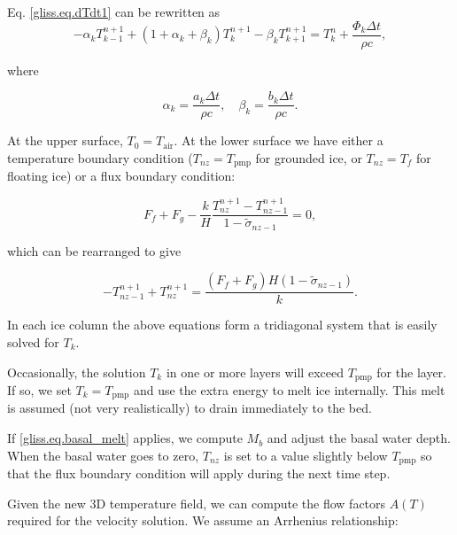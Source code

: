 Eq. \eqref{gliss.eq.dTdt1} can be rewritten as
\begin{equation}
  \label{gliss.eq.dTdt2}
  -{{\alpha }_{k}}T_{k-1}^{n+1} + (1+{{\alpha }_{k}}+{{\beta }_{k}})T_{k}^{n+1} - {{\beta }_{k}}T_{k+1}^{n+1} =
  T_{k}^{n} + \frac{{{\Phi }_{k}}\Delta t}{\rho c},
\end{equation}

\noindent
where

\begin{equation}
   {{\alpha }_{k}}=\frac{{{a}_{k}}\Delta t}{\rho c}, \quad {{\beta }_{k}}=\frac{{{b}_{k}}\Delta t}{\rho c}.
\end{equation}

\noindent
At the upper surface, $T_0 = T_{\mathrm{air}}$.  At the lower surface we have either 
a temperature boundary condition ($T_{nz} = T_{\mathrm{pmp}}$ for grounded ice, or
$T_{nz} = T_f$ for floating ice) or a flux boundary condition:

\begin{equation}
  \label{gliss.eq.lower_flux_bc}
  {{F}_{f}}+{{F}_{g}}-\frac{k}{H}\frac{T_{nz}^{n+1}-T_{nz-1}^{n+1}}{1-{{{\tilde{\sigma }}}_{nz-1}}} = 0,
\end{equation}

\noindent
which can be rearranged to give

\begin{equation}
  \label{gliss.eq.lower_flux_bc2}
  -T_{nz-1}^{n+1}+T_{nz}^{n+1} = \frac{\left( {{F}_{f}}+{{F}_{g}} \right)H\left( 1-{{{\tilde{\sigma }}}_{nz-1}} \right)}{k}.
\end{equation}

\noindent
In each ice column the above equations form a tridiagonal system that is easily solved for $T_k$.

Occasionally, the solution $T_k$ in one or more layers will exceed $T_{\mathrm{pmp}}$ for the layer.
If so, we set $T_k = T_{\mathrm{pmp}}$ and use the extra energy to melt ice internally.
This melt is assumed (not very realistically) to drain immediately to the bed.

If \eqref{gliss.eq.basal_melt} applies, we compute $M_b$ and adjust the basal water depth.
When the basal water goes to zero, $T_{nz}$ is set to a value slightly below $T_{\mathrm{pmp}}$
so that the flux boundary condition will apply during the next time step.

Given the new 3D temperature field, we can compute the flow factors $A(T)$ required for
the velocity solution.  We assume an Arrhenius relationship:

